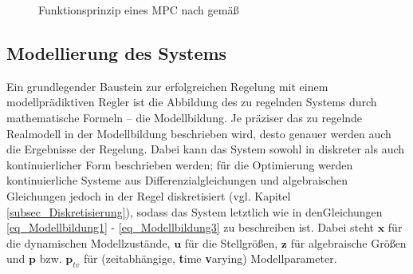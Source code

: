 \begin{figure}[h!]
    \centering
    \setlength{\fboxsep}{1pt}
    \setlength{\fboxrule}{1pt}
\caption[Funktionsprinzip eines MPC]{Funktionsprinzip eines MPC nach \cite[S.3]{Schwenzer} gemäß \cite{Richalet}}
    \label{fig_MPCVerhalten}
\end{figure}

\subsection{Modellierung des Systems} \label{subsec_Modellbildung}
Ein grundlegender Baustein zur erfolgreichen Regelung mit einem modellprädiktiven Regler ist die Abbildung des zu regelnden Systems durch mathematische Formeln – die Modellbildung.
Je präziser das zu regelnde Realmodell in der Modellbildung beschrieben wird, desto genauer werden auch die Ergebnisse der Regelung.
Dabei kann das System sowohl in diskreter als auch kontinuierlicher Form beschrieben werden; für die Optimierung werden kontinuierliche Systeme aus Differenzialgleichungen und algebraischen Gleichungen jedoch in der Regel diskretisiert (vgl. Kapitel \ref{subsec_Diskretisierung}), sodass das System letztlich wie in den\linebreak Gleichungen \ref{eq_Modellbildung1} - \ref{eq_Modellbildung3} zu beschreiben ist.
Dabei steht $\boldsymbol{x}$ für die dynamischen Modellzustände, $\boldsymbol{u}$ für die Stellgrößen, $\boldsymbol{z}$ für algebraische Größen und $\boldsymbol{p}$ bzw.
$\boldsymbol{p}_{tv}$ für (zeitabhängige, \textbf{t}ime \textbf{v}arying) Modellparameter. \cite[S.3]{Schwenzer}\cite{Dompc1}

